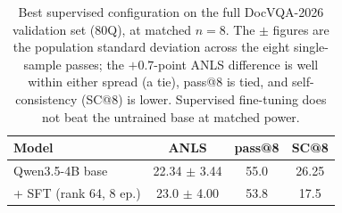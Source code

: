 \begin{table}[t]
\centering
\small
\setlength{\tabcolsep}{4pt}
\begin{tabular}{lccc}
\toprule
Model & ANLS & pass@8 & SC@8 \\
\midrule
Qwen3.5-4B base & 22.34 $\pm$ 3.44 & 55.0 & 26.25 \\
\quad + SFT (rank 64, 8 ep.) & 23.0 $\pm$ 4.00 & 53.8 & 17.5 \\
\bottomrule
\end{tabular}
\caption{Best supervised configuration on the full DocVQA-2026 validation set (80Q), at matched $n{=}8$. The $\pm$ figures are the population standard deviation across the eight single-sample passes; the $+0.7$-point ANLS difference is well within either spread (a tie), pass@8 is tied, and self-consistency (SC@8) is lower. Supervised fine-tuning does not beat the untrained base at matched power.}
\label{tab:sft}
\end{table}


